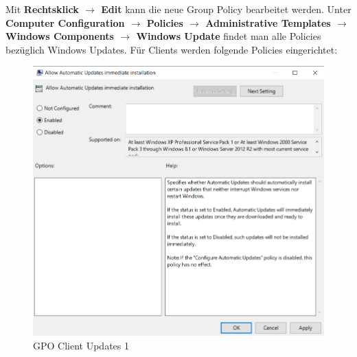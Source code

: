Mit \textbf{Rechtsklick $\rightarrow$ Edit} kann die neue Group Policy bearbeitet werden.
Unter \textbf{Computer Configuration $\rightarrow$ Policies $\rightarrow$ Administrative Templates $\rightarrow$ Windows Components $\rightarrow$ Windows Update} findet man alle Policies bezüglich Windows Updates.
Für Clients werden folgende Policies eingerichtet:

\begin{minipage}{0.5\linewidth}
    \begin{figure}[H]
        \centering
        \includegraphics[width=\linewidth]{../img/Updates/client-allow-immediate-updates.png}
        \caption{GPO Client Updates 1}
    \end{figure}
\end{minipage}
